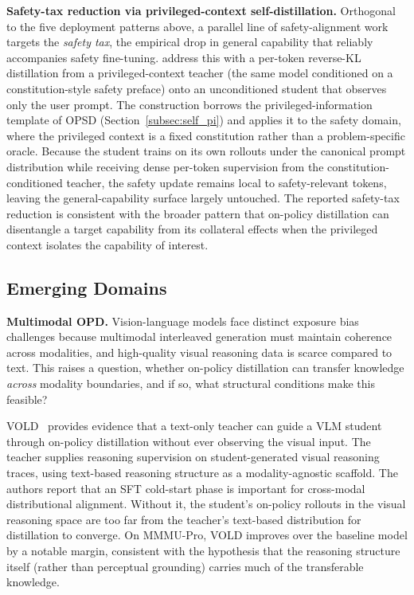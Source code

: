 \documentclass{article} %
\begin{document}
\textbf{Safety-tax reduction via privileged-context self-distillation.} Orthogonal to the five deployment patterns above, a parallel line of safety-alignment work targets the \emph{safety tax}, the empirical drop in general capability that reliably accompanies safety fine-tuning. \citet{2605.15239} address this with a per-token reverse-KL distillation from a privileged-context teacher (the same model conditioned on a constitution-style safety preface) onto an unconditioned student that observes only the user prompt. The construction borrows the privileged-information template of OPSD (Section~\ref{subsec:self_pi}) and applies it to the safety domain, where the privileged context is a fixed constitution rather than a problem-specific oracle. Because the student trains on its own rollouts under the canonical prompt distribution while receiving dense per-token supervision from the constitution-conditioned teacher, the safety update remains local to safety-relevant tokens, leaving the general-capability surface largely untouched. The reported safety-tax reduction is consistent with the broader pattern that on-policy distillation can disentangle a target capability from its collateral effects when the privileged context isolates the capability of interest.

\subsection{Emerging Domains}
\label{subsec:emerging}

\textbf{Multimodal OPD.} Vision-language models face distinct exposure bias challenges because multimodal interleaved generation must maintain coherence across modalities, and high-quality visual reasoning data is scarce compared to text. This raises a question, whether on-policy distillation can transfer knowledge \emph{across} modality boundaries, and if so, what structural conditions make this feasible?

VOLD~\citep{2510.23497} provides evidence that a text-only teacher can guide a VLM student through on-policy distillation without ever observing the visual input. The teacher supplies reasoning supervision on student-generated visual reasoning traces, using text-based reasoning structure as a modality-agnostic scaffold. The authors report that an SFT cold-start phase is important for cross-modal distributional alignment. Without it, the student's on-policy rollouts in the visual reasoning space are too far from the teacher's text-based distribution for distillation to converge. On MMMU-Pro, VOLD improves over the baseline model by a notable margin, consistent with the hypothesis that the reasoning structure itself (rather than perceptual grounding) carries much of the transferable knowledge.
\end{document}
